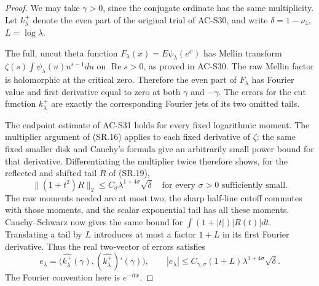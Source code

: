 \begin{proof}
We may take $\gamma>0$, since the conjugate ordinate
has the same multiplicity.  Let $k_\lambda^+$ denote
the even part of the original trial of AC-S30,
and write $\delta=1-\nu_4$, $L=\log\lambda$.

The full, uncut theta function
$F_\lambda(x)=E\psi_\lambda(e^x)$ has Mellin transform
$\zeta(s)\int\psi_\lambda(u)u^{s-1}du$ on
$\operatorname{Re}s>0$, as proved in AC-S30.
The raw Mellin factor is holomorphic at the critical
zero.  Therefore the even part of $F_\lambda$ has
Fourier value and first derivative equal to zero
at both $\gamma$ and $-\gamma$.
The errors for the cut function $k_\lambda^+$ are
exactly the corresponding Fourier jets of its two
omitted tails.

The endpoint estimate of AC-S31 holds for every
fixed logarithmic moment.  The multiplier argument
of (SR.16) applies to each fixed derivative of
$\zeta$: the same fixed smaller disk and Cauchy's
formula give an arbitrarily small power bound for
that derivative.  Differentiating the multiplier
twice therefore shows, for the reflected and shifted
tail $R$ of (SR.19),
\[
 \|(1+t^2)R\|_2
             \leq C_\sigma\lambda^{1+4\sigma}\sqrt\delta
                       \quad\text{for every }\sigma>0
                       \text{ sufficiently small}. \tag{SM.2}
\]
The raw moments needed are at most two; the sharp
half-line cutoff commutes with those moments, and
the scalar exponential tail has all these moments.
Cauchy--Schwarz now gives the same bound for
$\int(1+|t|)|R(t)|dt$.
Translating a tail by $L$ introduces at most a factor
$1+L$ in its first Fourier derivative.
Thus the real two-vector of errors satisfies
\[
 e_\lambda=
     \bigl(\widehat{k_\lambda^+}(\gamma),
                    (\widehat{k_\lambda^+})'(\gamma)\bigr),
 \qquad |e_\lambda|\leq
       C_{\gamma,\sigma}(1+L)
                         \lambda^{1+4\sigma}\sqrt\delta.
                                                        \tag{SM.3}
\]
The Fourier convention here is $e^{-itx}$.


\end{proof}
